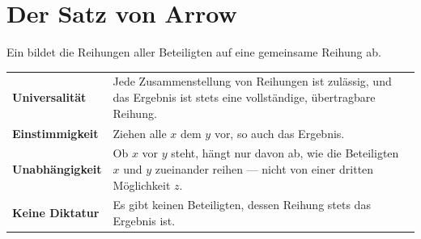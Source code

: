 \section{Der Satz von Arrow}

\begin{merksatz}
Ein  bildet die Reihungen aller Beteiligten auf eine gemeinsame Reihung ab.

\begin{center}
{\small
\renewcommand{\arraystretch}{1.55}
\begin{tabular}{@{}P{2.6cm}P{6.0cm}@{}}
\toprule
\textbf{Universalität} & Jede Zusammenstellung von Reihungen ist zulässig, und das Ergebnis ist stets eine vollständige, übertragbare Reihung.\\
\textbf{Einstimmigkeit} & Ziehen alle $x$ dem $y$ vor, so auch das Ergebnis.\\
\textbf{Unabhängigkeit} & Ob $x$ vor $y$ steht, hängt nur davon ab, wie die Beteiligten $x$ und $y$ zueinander reihen --- nicht von einer dritten Möglichkeit $z$.\\
\textbf{Keine Diktatur} & Es gibt keinen Beteiligten, dessen Reihung stets das Ergebnis ist.\\
\bottomrule
\end{tabular}}
\end{center}
\end{merksatz}

